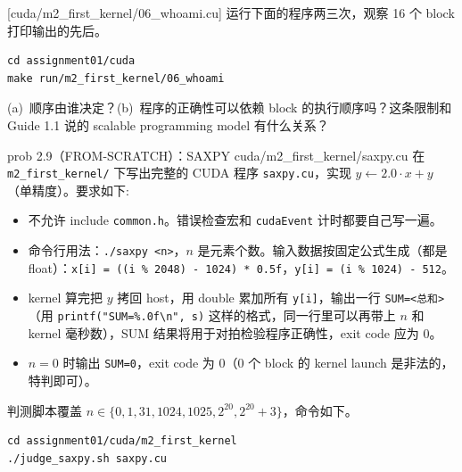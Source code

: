 \documentclass[11pt,a4paper,fontset=none]{ctexart}
\begin{document}

[cuda/m2\_first\_kernel/06\_whoami.cu]
运行下面的程序两三次，观察 16 个 block 打印输出的先后。

\begin{lstlisting}
cd assignment01/cuda
make run/m2_first_kernel/06_whoami
\end{lstlisting}

(a)~顺序由谁决定？(b)~程序的正确性可以依赖 block 的执行顺序吗？这条限制和 Guide 1.1 说的 scalable programming model 有什么关系？


\begin{capstone}{prob 2.9（FROM-SCRATCH）：SAXPY \hfill {\footnotesize\ttfamily cuda/m2\_first\_kernel/saxpy.cu}}
在 \texttt{m2\_first\_kernel/} 下写出完整的 CUDA 程序 \texttt{saxpy.cu}，实现 $y \leftarrow 2.0 \cdot x + y$（单精度）。要求如下:
\begin{itemize}
  \item 不允许 include \texttt{common.h}。错误检查宏和 \texttt{cudaEvent} 计时都要自己写一遍。
  \item 命令行用法：\texttt{./saxpy <n>}，$n$ 是元素个数。输入数据按固定公式生成（都是 float）：\texttt{x[i] = ((i \% 2048) - 1024) * 0.5f}，\texttt{y[i] = (i \% 1024) - 512}。
  \item kernel 算完把 $y$ 拷回 host，用 double 累加所有 \texttt{y[i]}，输出一行 \texttt{SUM=<总和>}（用 \texttt{printf("SUM=\%.0f\textbackslash n", s)} 这样的格式，同一行里可以再带上 $n$ 和 kernel 毫秒数），SUM 结果将用于对拍检验程序正确性，exit code 应为 0。
  \item $n = 0$ 时输出 \texttt{SUM=0}，exit code 为 0（0 个 block 的 kernel launch 是非法的，特判即可）。
\end{itemize}
\end{capstone}

判测脚本覆盖 $n \in \{0, 1, 31, 1024, 1025, 2^{20}, 2^{20}{+}3\}$，命令如下。

\begin{lstlisting}
cd assignment01/cuda/m2_first_kernel
./judge_saxpy.sh saxpy.cu
\end{lstlisting}
\end{document}
